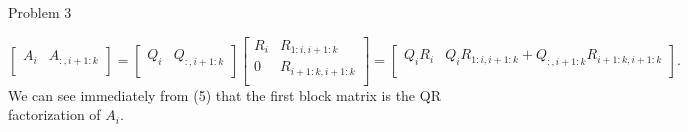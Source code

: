 \begin{problem}{Problem 3}
\begin{highlight}[Solution]
        \begin{equation}
            \begin{bmatrix}
                A_{i} & A_{:,i+1:k} \\
            \end{bmatrix}
            = 
            \begin{bmatrix}
                Q_{i} & Q_{:,i+1:k} \\
            \end{bmatrix}
            \begin{bmatrix}
                R_{i} & R_{1:i,i+1:k} \\
                0 & R_{i+1:k,i+1:k} \\
            \end{bmatrix}
            = 
            \begin{bmatrix}
                Q_{i}R_{i} & Q_{i}R_{1:i,i+1:k} + Q_{:,i+1:k}R_{i+1:k,i+1:k} \\
            \end{bmatrix}.
        \end{equation}
        We can see immediately from (5) that the first block matrix is the QR factorization of $A_{i}$.
    \end{highlight}
\end{problem}

